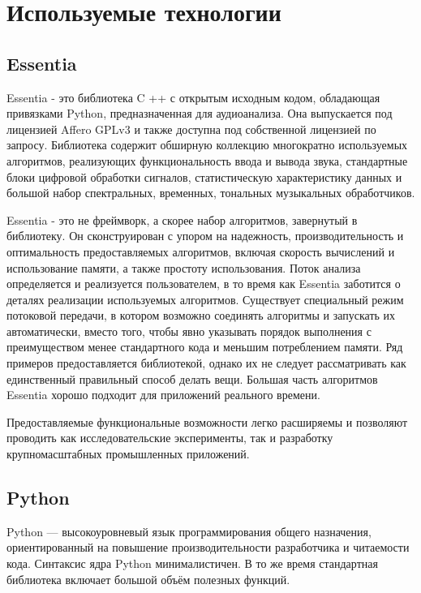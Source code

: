 \section{Используемые технологии}
\label{sec:development}

\subsection{Essentia}
\label{sec:development:essentia}

Essentia - это библиотека C ++ с открытым исходным кодом, обладающая привязками Python, предназначенная для аудиоанализа. Она выпускается под лицензией Affero GPLv3 и также доступна под собственной лицензией по запросу. Библиотека содержит обширную коллекцию многократно используемых алгоритмов, реализующих функциональность ввода и вывода звука, стандартные блоки цифровой обработки сигналов, статистическую характеристику данных и большой набор спектральных, временных, тональных музыкальных обработчиков.

Essentia - это не фреймворк, а скорее набор алгоритмов, завернутый в библиотеку. Он сконструирован с упором на надежность, производительность и оптимальность предоставляемых алгоритмов, включая скорость вычислений и использование памяти, а также простоту использования. Поток анализа определяется и реализуется пользователем, в то время как Essentia заботится о деталях реализации используемых алгоритмов. Существует специальный режим потоковой передачи, в котором возможно соединять алгоритмы и запускать их автоматически, вместо того, чтобы явно указывать порядок выполнения с преимуществом менее стандартного кода и меньшим потреблением памяти. Ряд примеров предоставляется библиотекой, однако их не следует рассматривать как единственный правильный способ делать вещи. Большая часть алгоритмов Essentia хорошо подходит для приложений реального времени.

Предоставляемые функциональные возможности легко расширяемы и позволяют проводить как исследовательские эксперименты, так и разработку крупномасштабных промышленных приложений.

\subsection{Python}
\label{sec:development:python}

Python — высокоуровневый язык программирования общего назначения, ориентированный на повышение производительности разработчика и читаемости кода. Синтаксис ядра Python минималистичен. В то же время стандартная библиотека включает большой объём полезных функций.

